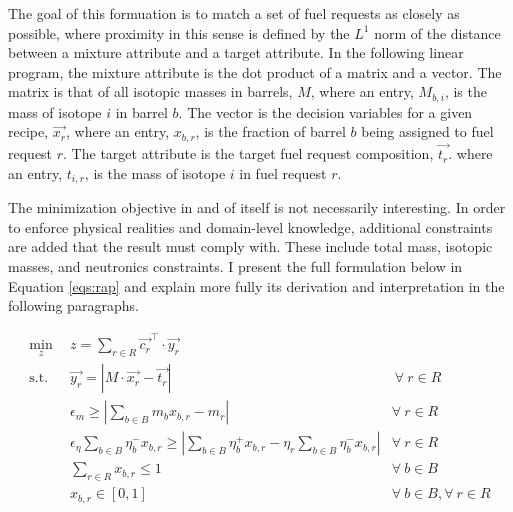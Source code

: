 The goal of this formuation is to match a set of fuel requests as closely as
possible, where proximity in this sense is defined by the $L^{1}$ norm of the
distance between a mixture attribute and a target attribute. In the following
linear program, the mixture attribute is the dot product of a matrix and a
vector. The matrix is that of all isotopic masses in barrels, $M$, where an
entry, $M_{b,i}$, is the mass of isotope $i$ in barrel $b$. The vector is the
decision variables for a given recipe, $\vec{x_{r}}$, where an entry, $x_{b,r}$,
is the fraction of barrel $b$ being assigned to fuel request $r$. The target
attribute is the target fuel request composition, $\vec{t_{r}}$. where an entry,
$t_{i,r}$, is the mass of isotope $i$ in fuel request $r$.

The minimization objective in and of itself is not necessarily interesting. In
order to enforce physical realities and domain-level knowledge, additional
constraints are added that the result must comply with. These include total
mass, isotopic masses, and neutronics constraints. I present the full
formulation below in Equation \ref{eqs:rap} and explain more fully its
derivation and interpretation in the following paragraphs.

\begin{subequations}\label{eqs:rap}
  \begin{align}
    \min_{z} \:\: & 
    z = \sum_{r \in R} \vec{c_{r}}^{\top} \cdot \vec{y_{r}}
    & \label{eqs:rap_obj} \\
    \text{s.t.} \:\: &
    \vec{y_{r}} = \left| M \cdot \vec{x_{r}}  - \vec{t_{r}} \right|
    &
    \: \forall \: r \in R \label{eqs:rap_iso} \\
    &
    \epsilon_{m} \geq \left| \sum_{b \in B} m_{b} x_{b,r} - m_{r} \right|
    & 
    \forall \: r \in R \label{eqs:rap_mass} \\
    &
    \epsilon_{\eta} \sum_{b \in B} \eta_{b}^{-} x_{b,r} \geq 
    \left| \sum_{b \in B} \eta_{b}^{+} x_{b,r} - 
           \eta_{r} \sum_{b \in B} \eta_{b}^{-} x_{b,r} \right|
    & 
    \forall \: r \in R \label{eqs:rap_eta} \\
    &
    \sum_{r \in R} x_{b,r} \leq 1
    & 
    \forall \: b \in B \label{eqs:rap_conserv} \\
    &
    x_{b,r} \in \left[ 0, 1 \right]
    & 
    \forall \: b \in B, \forall \: r \in R  \label{eqs:rap_x}
  \end{align}
\end{subequations}

